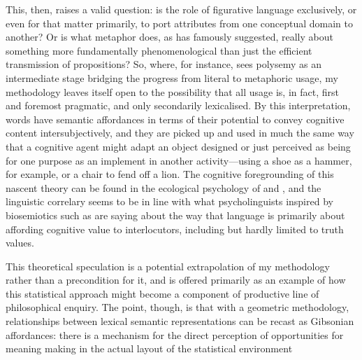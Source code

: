 This, then, raises a valid question: is the role of figurative language exclusively, or even for that matter primarily, to port attributes from one conceptual domain to another?  Or is what metaphor does, as \cite{Davidson} has famously suggested, really about something more fundamentally phenomenological than just the efficient transmission of propositions?  So, where, for instance, \cite{Sweetser} sees polysemy as an intermediate stage bridging the progress from literal to metaphoric usage, my methodology leaves itself open to the possibility that all usage is, in fact, first and foremost pragmatic, and only secondarily lexicalised.  By this interpretation, words have semantic affordances in terms of their potential to convey cognitive content intersubjectively, and they are picked up and used in much the same way that a cognitive agent might adapt an object designed or just perceived as being for one purpose as an implement in another activity---using a shoe as a hammer, for example, or a chair to fend off a lion.  The cognitive foregrounding of this nascent theory can be found in the ecological psychology of \cite{Gibson} and \cite{Bateson}, and the linguistic correlary seems to be in line with what psycholinguists inspired by biosemiotics such as \cite{Raczsek} are saying about the way that language is primarily about affording cognitive value to interlocutors, including but hardly limited to truth values.

This theoretical speculation is a potential extrapolation of my methodology rather than a precondition for it, and is offered primarily as an example of how this statistical approach might become a component of productive line of philosophical enquiry.  The point, though, is that with a geometric methodology, relationships between lexical semantic representations can be recast as Gibsonian affordances: there is a mechanism for the direct perception of opportunities for meaning making in the actual layout of the statistical environment
